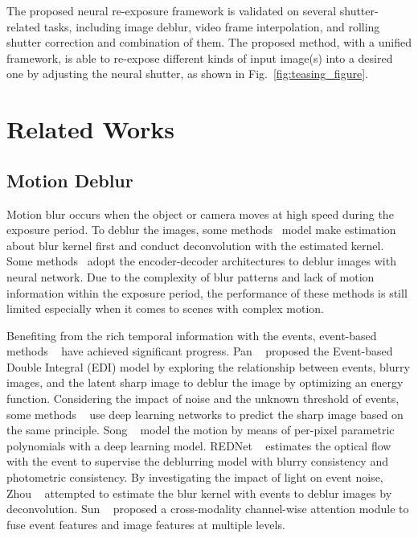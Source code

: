 \documentclass[10pt,twocolumn,letterpaper]{article}
\begin{document}
The proposed neural re-exposure framework is validated on several shutter-related tasks, including image deblur, video frame interpolation, and rolling shutter correction and combination of them. The proposed method, with a unified framework, is able to re-expose different kinds of input image(s) into a desired one by adjusting the neural shutter, as shown in Fig.~\ref{fig:teasing_figure}.
 

\section{Related Works}






\subsection{Motion Deblur}
Motion blur occurs when the object or camera moves at high speed during the exposure period. 
To deblur the images, some methods~\cite{kernel1,kernel2} model make estimation about blur kernel first and conduct deconvolution with the estimated kernel.
Some methods~\cite{DeepDeblur,MIMO,NAFNet} adopt the encoder-decoder architectures to deblur images with neural network. 
Due to the complexity of blur patterns and lack of motion information within the exposure period, the performance of these methods is still limited especially when it comes to scenes with complex motion.

Benefiting from the rich temporal information with the events, event-based methods  ~\cite{EDI,LEMD,LEDVDI,EVDI,E-CIR,REDNet} have achieved significant progress. 
Pan \etal~\cite{EDI} proposed the Event-based Double Integral (EDI) model by exploring the relationship between events, blurry images, and the latent sharp image to deblur the image by optimizing an energy function.
Considering the impact of noise and the unknown threshold of events, some methods ~\cite{LEMD,LEDVDI,EVDI} use deep learning networks to predict the sharp image based on the same principle. 
Song \etal~\cite{E-CIR} model the motion by means of per-pixel parametric polynomials with a deep learning model. 
REDNet \etal~\cite{REDNet} estimates the optical flow with the event to supervise the deblurring model with blurry consistency and photometric consistency. 
By investigating the impact of light on event noise, Zhou \etal~\cite{lowlight} attempted to estimate the blur kernel with events to deblur images by deconvolution. 
Sun \etal~\cite{EFNet} proposed a cross-modality channel-wise attention module to fuse event features and image features at multiple levels.
\end{document}
